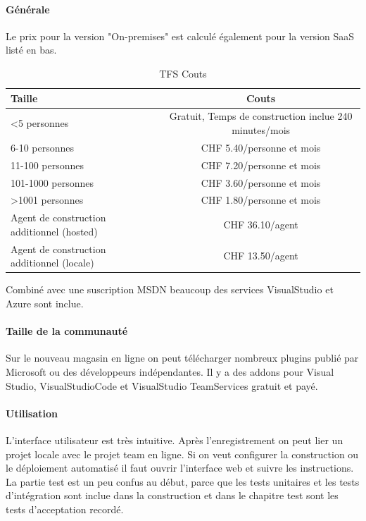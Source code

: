 \paragraph{Générale}  Le prix pour la version "On-premises" est calculé également pour la version SaaS listé en bas.
\begin{table} [H]
	\centering
		\begin{tabular}{l|c} \toprule
			\textbf{Taille} & \textbf{Couts} \\ \midrule
			<5 personnes & Gratuit, Temps de construction inclue 240 minutes/mois \\
			6-10 personnes & CHF 5.40/personne et mois \\
			11-100 personnes & CHF 7.20/personne et mois\\
			101-1000 personnes & CHF 3.60/personne et mois \\
			>1001 personnes & CHF 1.80/personne et mois \\ \midrule
			Agent de construction additionnel (hosted) & CHF 36.10/agent \\
			Agent de construction additionnel (locale) & CHF 13.50/agent \\ \bottomrule
		\end{tabular}
	\caption{TFS Couts}
\end{table}
Combiné avec une suscription MSDN beaucoup des services VisualStudio et Azure sont inclue.
\paragraph{Taille de la communauté} Sur le nouveau magasin en ligne on peut télécharger nombreux plugins publié par Microsoft ou des développeurs indépendantes. Il y a des addons pour Visual Studio, VisualStudioCode et VisualStudio TeamServices gratuit et payé.
\paragraph{Utilisation} L'interface utilisateur est très intuitive. Après l'enregistrement on peut lier un projet locale avec le projet team en ligne. Si on veut configurer la construction ou le déploiement automatisé il faut ouvrir l'interface web et suivre les instructions. 
La partie test est un peu confus au début, parce que les tests unitaires et les tests d'intégration sont inclue dans la construction et dans le chapitre test sont les tests d'acceptation recordé.

